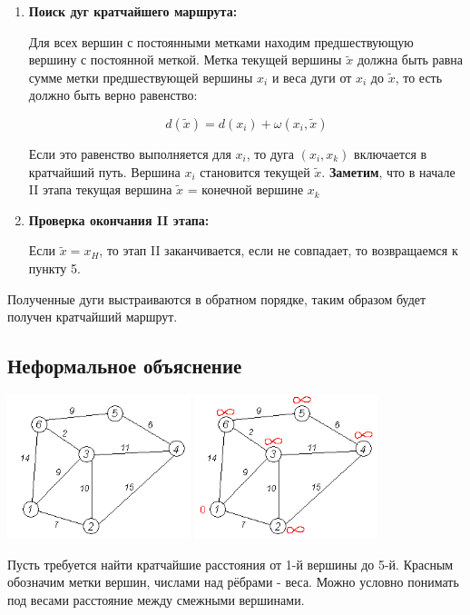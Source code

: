 \documentclass[12pt, a4paper, oneside]{article}
\theoremstyle{plain} %
\theoremstyle{definition}
\newcommand{\indef}[1]{\textbf{ \color{dark_red} #1}}
\begin{document}
\begin{enumerate}
\item \textbf{Поиск дуг кратчайшего маршрута:}

Для всех вершин с постоянными метками находим предшествующую вершину с постоянной меткой. Метка текущей вершины $\tilde x$ должна быть равна сумме метки предшествующей  вершины $x_i$ и веса дуги от $x_i$ до $\tilde x$, то есть должно быть верно равенство:

\[
 d(\tilde x)= d(x_i) + \omega(x_i, \tilde x )
\]

Если это равенство выполняется для $x_i$, то дуга $(x_i,x_k)$ включается в кратчайший путь. Вершина $x_i$ становится текущей $\tilde x$. \indef{Заметим}, что в начале II этапа текущая вершина $\tilde x$ = конечной вершине $x_k$


\item \textbf{Проверка окончания II этапа:}

Если $\tilde x = x_H$, то этап II заканчивается, если не совпадает, то возвращаемся к пункту 5.
\end{enumerate}

Полученные дуги выстраиваются в обратном порядке, таким образом будет получен кратчайший маршрут.

\subsection*{Неформальное объяснение}
\includegraphics[width=0.4\textwidth]{Dijkstra/Dijkstra_graph0.png}
\includegraphics[width=0.4\textwidth]{Dijkstra/Dijkstra_graph1.png}

Пусть требуется найти кратчайшие расстояния от 1-й вершины до 5-й. Красным обозначим метки вершин, числами над рёбрами - веса. Можно условно понимать под весами расстояние между смежными вершинами.
\end{document}
